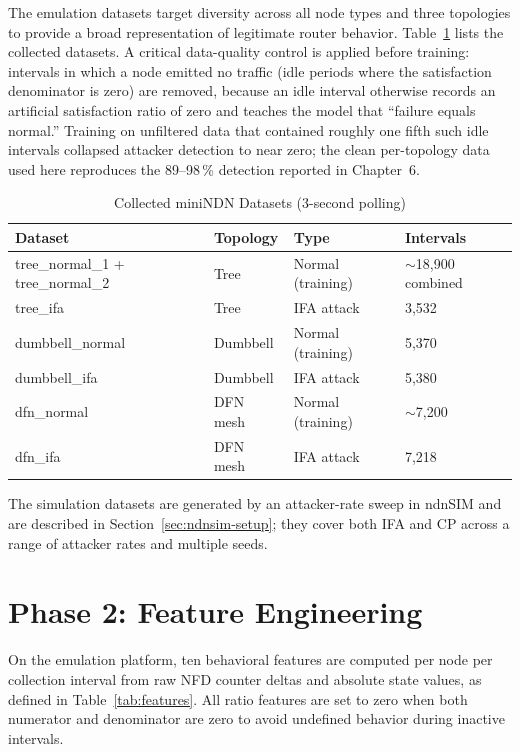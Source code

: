 \documentclass[12pt]{report}
\begin{document}
The emulation datasets target diversity across all node types and three topologies to provide a broad representation of legitimate router behavior. Table~\ref{tab:datasets} lists the collected datasets. A critical data-quality control is applied before training: intervals in which a node emitted no traffic (idle periods where the satisfaction denominator is zero) are removed, because an idle interval otherwise records an artificial satisfaction ratio of zero and teaches the model that ``failure equals normal.'' Training on unfiltered data that contained roughly one fifth such idle intervals collapsed attacker detection to near zero; the clean per-topology data used here reproduces the 89--98\,\% detection reported in Chapter~6.

\begin{table}[H]
\centering
\caption{Collected miniNDN Datasets (3-second polling)}
\label{tab:datasets}
\begin{tabular}{@{}llll@{}}
\toprule
\textbf{Dataset}            & \textbf{Topology} & \textbf{Type}      & \textbf{Intervals} \\
\midrule
tree\_normal\_1 + tree\_normal\_2 & Tree        & Normal (training)  & $\sim$18{,}900 combined \\
tree\_ifa                   & Tree              & IFA attack         & 3{,}532 \\
dumbbell\_normal            & Dumbbell          & Normal (training)  & 5{,}370 \\
dumbbell\_ifa               & Dumbbell          & IFA attack         & 5{,}380 \\
dfn\_normal                 & DFN mesh          & Normal (training)  & $\sim$7{,}200 \\
dfn\_ifa                    & DFN mesh          & IFA attack         & 7{,}218 \\
\bottomrule
\end{tabular}
\end{table}

The simulation datasets are generated by an attacker-rate sweep in ndnSIM and are described in Section~\ref{sec:ndnsim-setup}; they cover both IFA and CP across a range of attacker rates and multiple seeds.

\section{Phase 2: Feature Engineering}
\label{sec:features}

On the emulation platform, ten behavioral features are computed per node per collection interval from raw NFD counter deltas and absolute state values, as defined in Table~\ref{tab:features}. All ratio features are set to zero when both numerator and denominator are zero to avoid undefined behavior during inactive intervals.
\end{document}
